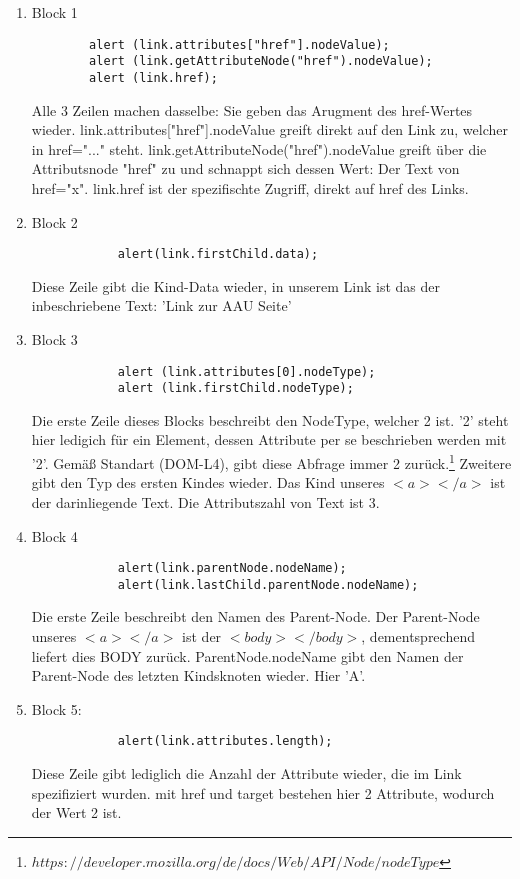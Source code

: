 \documentclass[11pt]{article}
\begin{document}
    \begin{enumerate}[$\diamond$]
        \item Block 1
        \begin{verbatim}
        alert (link.attributes["href"].nodeValue);
        alert (link.getAttributeNode("href").nodeValue);
        alert (link.href);
        \end{verbatim}
        Alle 3 Zeilen machen dasselbe: Sie geben das Arugment des href-Wertes wieder.
        link.attributes["href"].nodeValue greift direkt auf den Link zu, welcher in href="..." steht.
        link.getAttributeNode("href").nodeValue greift über die Attributsnode "href" zu und schnappt sich dessen Wert: Der Text von href="x".
        link.href ist der spezifischte Zugriff, direkt auf href des Links.

        \item Block 2
        \begin{verbatim}
            alert(link.firstChild.data);
        \end{verbatim}
        Diese Zeile gibt die Kind-Data wieder, in unserem Link ist das der inbeschriebene Text:
        'Link zur AAU Seite'

        \item Block 3
        \begin{verbatim}
            alert (link.attributes[0].nodeType);
            alert (link.firstChild.nodeType);
        \end{verbatim}
        Die erste Zeile dieses Blocks beschreibt den NodeType, welcher 2 ist.
        '2' steht hier ledigich für ein Element, dessen Attribute per se beschrieben werden mit '2'.
        Gemäß Standart (DOM-L4), gibt diese Abfrage immer 2 zurück.\footnote[1]{$https://developer.mozilla.org/de/docs/Web/API/Node/nodeType$}
        Zweitere gibt den Typ des ersten Kindes wieder. Das Kind unseres $<a></a>$ ist der darinliegende Text.
        Die Attributszahl von Text ist 3.

        \item Block 4
        \begin{verbatim}
            alert(link.parentNode.nodeName);
            alert(link.lastChild.parentNode.nodeName);
        \end{verbatim}
        Die erste Zeile beschreibt den Namen des Parent-Node. Der Parent-Node unseres $<a></a>$ ist der $<body></body>$,
        dementsprechend liefert dies BODY zurück.
        ParentNode.nodeName gibt den Namen der Parent-Node des letzten Kindsknoten wieder.
        Hier 'A'.

        \item Block 5:
        \begin{verbatim}
            alert(link.attributes.length);
        \end{verbatim}
        Diese Zeile gibt lediglich die Anzahl der Attribute wieder, die im Link spezifiziert wurden.
        mit href und target bestehen hier 2 Attribute, wodurch der Wert 2 ist.

    \end{enumerate}
\end{document}
